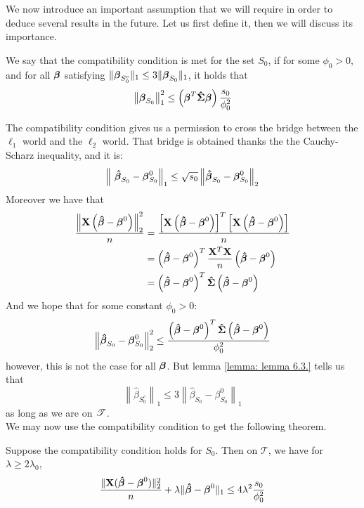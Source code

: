 We now introduce an important assumption that we will require in order to deduce several results in the future. Let us first define it, then we will discuss its importance.
\begin{definition}
    We say that the compatibility condition is met for the set $S_{0}$, if for some $\phi_{0}>0$, and for all $\boldsymbol{\beta}$ satisfying $ \|\boldsymbol{\beta}_{S_{0}^{c}} \|_{1} \leq 3 \|\boldsymbol{\beta}_{S_{0}} \|_{1}$, it holds that
    \begin{equation}
        \left\| \boldsymbol{\beta}_{S_{0}} \right\|_{1}^{2} \leq \left(\boldsymbol{\beta}^{T} \boldsymbol{\hat{\Sigma}} \boldsymbol{\beta}\right) \frac{s_{0}}{\phi_{0}^{2}}
    \end{equation}
\end{definition}
The compatibility condition gives us a permission to cross the bridge between the \(\ell_1\) world and the \(\ell_2\) world. That bridge is obtained thanks the the Cauchy-Scharz inequality, and it is:
\[
    \left\|\ \boldsymbol{\hat{\beta}}_{S_{0}} - \boldsymbol{\beta}_{S_{0}}^{0} \right\|_{1} \leq \sqrt{s_{0}}\left\|\boldsymbol{\hat{\beta}}_{S_{0}} - \boldsymbol{\beta}_{S_{0}}^{0} \right\|_{2}
\]
Moreover we have that
\begin{align*}
    \frac{\left\|\mathbf{X}\left(\boldsymbol{\hat{\beta}} - \boldsymbol{\beta}^{0}\right)\right\|_{2}^{2}}{n} 
    & = \frac{\left[ \mathbf{X} \left( \boldsymbol{\hat{\beta}} - \boldsymbol{\beta}^{0}\right) \right]^T \left[\mathbf{X} \left(\boldsymbol{\hat{\beta}} - \boldsymbol{\beta}^{0}\right) \right]}{n} \\
    & = \left(\boldsymbol{\hat{\beta}} - \boldsymbol{\beta}^{0}\right)^{T} \frac{ \mathbf{X}^T \mathbf{X} }{n} \left(\boldsymbol{\hat{\beta}} - \boldsymbol{\beta}^{0}\right) \\
    & = \left(\boldsymbol{\hat{\beta}} - \boldsymbol{\beta}^{0}\right)^{T} \boldsymbol{\hat{\Sigma}} \left(\boldsymbol{\hat{\beta}} - \boldsymbol{\beta}^{0}\right)
\end{align*}
And we hope that for some constant \(\phi_0 > 0\):
\[
    \left\| \boldsymbol{\hat{\beta}}_{S_0} - \boldsymbol{\beta}_{S_0}^{0} \right\|_{2}^{2} \leq \frac{\left(\boldsymbol{\hat{\beta}} - \boldsymbol{\beta}^{0}\right)^{T} \boldsymbol{\hat{\Sigma}} \left(\boldsymbol{\hat{\beta}} - \boldsymbol{\beta}^{0}\right)}{\phi_0^2}
\]
however, this is not the case for all \(\boldsymbol{\beta}\). But lemma \ref{lemma: lemma 6.3.} tells us that
\[
    \left\|\hat{\beta}_{S_{0}^{c}}\right\|_{1} \leq 3\left\|\hat{\beta}_{S_{0}}-\beta_{S_{0}}^{0}\right\|_{1}
\]
as long as we are on \(\mathscr{T}\). \\
We may now use the compatibility condition to get the following theorem.
\begin{theorem} %
    Suppose the compatibility condition holds for $S_{0}$. Then on $\mathscr{T}$, we have for $\lambda \geq 2 \lambda_{0}$,
    \[
        \frac{\|\mathbf{X}(\boldsymbol{\hat{\beta}}-\boldsymbol{\beta}^{0})\|_{2}^{2}}{n}+\lambda\|\boldsymbol{\hat{\beta}}-\boldsymbol{\beta}^{0}\|_{1} \leq 4 \lambda^{2} \frac{s_{0}}{\phi_{0}^{2}}
    \]
\end{theorem}

